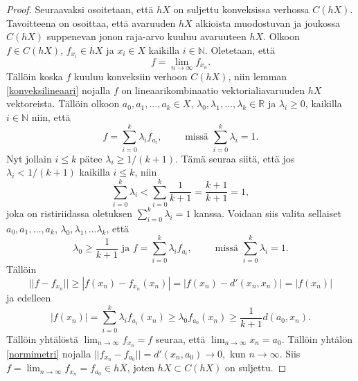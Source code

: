 \documentclass[12pt,a4paper,leqno]{report}
\newcommand{\R}{\mathbb{R}}
\newcommand{\N}{\mathbb{N}}
\theoremstyle{plain}
\theoremstyle{definition}
\theoremstyle{remark}
\begin{document}
\begin{proof}
Seuraavaksi osoitetaan, että $hX$ on suljettu konveksissa verhossa $C(hX)$. 
Tavoitteena on osoittaa, että avaruuden $hX$ alkioista muodostuvan ja joukossa $C(hX)$ suppenevan jonon raja-arvo kuuluu avaruuteen $ hX$. 
Olkoon $f\in C(hX)$, $f_{x_i}\in hX$ ja $ x_i\in X$ kaikilla $ i\in \N$. 
Oletetaan, että 
$$f=\lim_{n\rightarrow\infty} f_{x_n}.$$ 
Tällöin koska $f$ kuuluu konveksiin verhoon $C(hX)$, niin lemman \ref{konveksilineaari} nojalla $f$ on lineaarikombinaatio vektorialiavaruuden $hX$ vektoreista. Tällöin olkoon $a_0,a_1,\dots, a_k \in X$, $\lambda_0,\lambda_1,\dots, \lambda_k \in \R$ ja $\lambda_i\geq 0$, kaikilla $ i\in\N$ niin, että 
$$f=\sum_{i=0}^k \lambda_i f_{a_i},\qquad \text{ missä } \sum_{i=0}^k \lambda_i =1.$$
Nyt jollain $i\leq k$ pätee $\lambda_i \geq 1/(k+1)$. Tämä seuraa siitä, että jos $\lambda_i<1/(k+1)$ kaikilla $i\leq k$, niin
$$\sum_{i=0}^k \lambda_i < \sum_{i=0}^k \dfrac{1}{k+1}=\dfrac{k+1}{k+1}=1,$$
joka on ristiriidassa oletuksen $\sum_{i=0}^k \lambda_i =1$ kanssa.
Voidaan siis valita sellaiset $a_0,a_1,\dots, a_k$, $\lambda_0,\lambda_1,\dots \lambda_k$, että 
$$\lambda_0\geq \dfrac{1}{k+1}\text{ ja }f=\sum_{i=0}^k \lambda_i f_{a_i},\qquad \text{ missä } \sum_{i=0}^k \lambda_i =1 .$$ 
Tällöin 
$$||f-f_{x_n}||\geq |f(x_n)-f_{x_n}(x_n)|=|f(x_n)-d'(x_n,x_n)|=|f(x_n)|$$ 
ja edelleen
$$|f(x_n)|=\sum_{i=0}^k \lambda_i f_{a_i}(x_n)\geq \lambda_0 f_{a_0}(x_n)\geq \dfrac{1}{k+1}d(a_0,x_n).$$
Tällöin yhtälöstä $\lim_{n\rightarrow\infty} f_{x_n}=f$ seuraa, että $\lim_{n\rightarrow\infty }x_n=a_0$. 
Tällöin yhtälön \ref{normimetri} nojalla
$||f_{x_n} - f_{a_0} ||=d'(x_n ,a_0 )\rightarrow 0,\text{ kun }n\rightarrow \infty.$
Siis $ f=\lim_{n\rightarrow\infty} f_{x_n}=f_{a_0}\in hX$, joten $hX\subset C(hX)$ on suljettu.

\end{proof}
\end{document}
